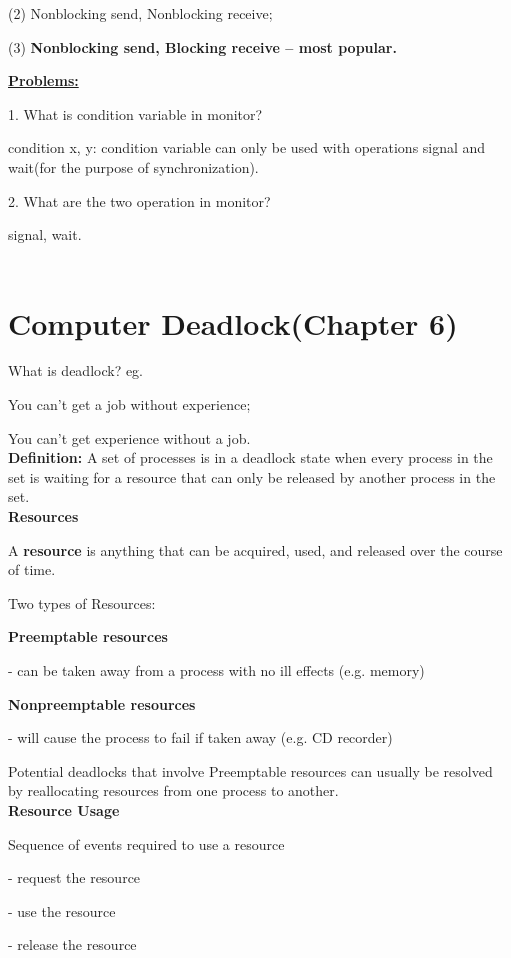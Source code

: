 \documentclass[]{report}
\begin{document}
(2) Nonblocking send, Nonblocking receive;

(3) \textbf{Nonblocking send, Blocking receive – most popular.}

\textbf{\underline{Problems:}}

1. What is condition variable in monitor?

condition x, y: condition variable can only be used with operations signal and wait(for the purpose of synchronization).

2. What are the two operation in monitor?

signal, wait.\\\\

\section*{Computer Deadlock(Chapter 6)}
What is deadlock? eg.

You can't get a job without experience;

You can't get experience without a job.\\

\textbf{Definition: }A set of processes is in a deadlock state when
every process in the set is waiting for a resource that can only be
released by another process in the set.\\

\textbf{Resources}

A \textbf{resource} is anything that can be acquired,
used, and released over the course of time.

Two types of Resources:

\textbf{Preemptable resources}

- can be taken away from a process with no ill effects
(e.g. memory)

\textbf{Nonpreemptable resources}

- will cause the process to fail if taken away (e.g. CD
recorder)

Potential deadlocks that involve Preemptable resources
can usually be resolved by reallocating resources from
one process to another.\\

\textbf{Resource Usage}

Sequence of events required to use a resource

- request the resource

- use the resource

- release the resource
\end{document}
